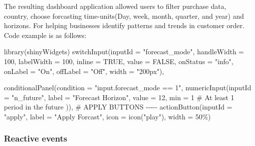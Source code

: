 \documentclass[
  11pt,
]{article}
\newenvironment{Shaded}{\begin{snugshade}}{\end{snugshade}}
\newcommand{\AttributeTok}[1]{\textcolor[rgb]{0.40,0.45,0.13}{#1}}
\newcommand{\CommentTok}[1]{\textcolor[rgb]{0.37,0.37,0.37}{#1}}
\newcommand{\ConstantTok}[1]{\textcolor[rgb]{0.56,0.35,0.01}{#1}}
\newcommand{\DecValTok}[1]{\textcolor[rgb]{0.68,0.00,0.00}{#1}}
\newcommand{\FunctionTok}[1]{\textcolor[rgb]{0.28,0.35,0.67}{#1}}
\newcommand{\NormalTok}[1]{\textcolor[rgb]{0.00,0.23,0.31}{#1}}
\newcommand{\StringTok}[1]{\textcolor[rgb]{0.13,0.47,0.30}{#1}}
\begin{document}
The resulting dashboard application allowed users to filter purchase
data, country, choose forcasting time-units(Day, week, month, quarter,
and year) and horizons. For helping businesses identify patterns and
trends in customer order. Code example is as follows:

\begin{Shaded}
\begin{Highlighting}[]
\FunctionTok{library}\NormalTok{(shinyWidgets)}
\FunctionTok{switchInput}\NormalTok{(}\AttributeTok{inputId =} \StringTok{"forecast\_mode"}\NormalTok{,}
            \AttributeTok{handleWidth =} \DecValTok{100}\NormalTok{,}
            \AttributeTok{labelWidth =} \DecValTok{100}\NormalTok{,}
            \AttributeTok{inline =} \ConstantTok{TRUE}\NormalTok{,}
            \AttributeTok{value =} \ConstantTok{FALSE}\NormalTok{,}
            \AttributeTok{onStatus =} \StringTok{"info"}\NormalTok{,}
            \AttributeTok{onLabel =} \StringTok{"On"}\NormalTok{,}
            \AttributeTok{offLabel =} \StringTok{"Off"}\NormalTok{,}
            \AttributeTok{width =} \StringTok{"200px"}\NormalTok{),}

\FunctionTok{conditionalPanel}\NormalTok{(}\AttributeTok{condition =} \StringTok{"input.forecast\_mode == 1"}\NormalTok{,}
                 \FunctionTok{numericInput}\NormalTok{(}\AttributeTok{inputId =} \StringTok{"n\_future"}\NormalTok{,}
                              \AttributeTok{label =} \StringTok{"Forecast Horizon"}\NormalTok{,}
                              \AttributeTok{value =} \DecValTok{12}\NormalTok{,}
                              \AttributeTok{min =} \DecValTok{1}  \CommentTok{\# At least 1 period in the future}
\NormalTok{                 )),}
\CommentTok{\# APPLY BUTTONS {-}{-}{-}{-}{-}}
\FunctionTok{actionButton}\NormalTok{(}\AttributeTok{inputId =} \StringTok{"apply"}\NormalTok{,}
             \AttributeTok{label   =} \StringTok{"Apply Forcast"}\NormalTok{,}
             \AttributeTok{icon    =} \FunctionTok{icon}\NormalTok{(}\StringTok{"play"}\NormalTok{),}
             \AttributeTok{width   =} \StringTok{\textquotesingle{}50\%\textquotesingle{}}\NormalTok{)}
\end{Highlighting}
\end{Shaded}

\hypertarget{reactive-events}{%
\subsubsection{Reactive events}\label{reactive-events}}
\end{document}
